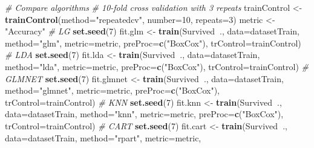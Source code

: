 \documentclass[]{article}
\newenvironment{Shaded}{\begin{snugshade}}{\end{snugshade}}
\newcommand{\KeywordTok}[1]{\textcolor[rgb]{0.13,0.29,0.53}{\textbf{#1}}}
\newcommand{\DataTypeTok}[1]{\textcolor[rgb]{0.13,0.29,0.53}{#1}}
\newcommand{\DecValTok}[1]{\textcolor[rgb]{0.00,0.00,0.81}{#1}}
\newcommand{\StringTok}[1]{\textcolor[rgb]{0.31,0.60,0.02}{#1}}
\newcommand{\CommentTok}[1]{\textcolor[rgb]{0.56,0.35,0.01}{\textit{#1}}}
\newcommand{\OperatorTok}[1]{\textcolor[rgb]{0.81,0.36,0.00}{\textbf{#1}}}
\newcommand{\NormalTok}[1]{#1}
\begin{document}
\begin{Shaded}
\begin{Highlighting}[]
\CommentTok{# Compare algorithms}
\CommentTok{# 10-fold cross validation with 3 repeats}
\NormalTok{trainControl <-}\StringTok{ }\KeywordTok{trainControl}\NormalTok{(}\DataTypeTok{method=}\StringTok{"repeatedcv"}\NormalTok{, }\DataTypeTok{number=}\DecValTok{10}\NormalTok{, }\DataTypeTok{repeats=}\DecValTok{3}\NormalTok{)}
\NormalTok{metric <-}\StringTok{ "Accuracy"}
\CommentTok{# LG}
\KeywordTok{set.seed}\NormalTok{(}\DecValTok{7}\NormalTok{)}
\NormalTok{fit.glm <-}\StringTok{ }\KeywordTok{train}\NormalTok{(Survived}\OperatorTok{~}\NormalTok{., }\DataTypeTok{data=}\NormalTok{datasetTrain, }\DataTypeTok{method=}\StringTok{"glm"}\NormalTok{, }\DataTypeTok{metric=}\NormalTok{metric, }\DataTypeTok{preProc=}\KeywordTok{c}\NormalTok{(}\StringTok{"BoxCox"}\NormalTok{),}
    \DataTypeTok{trControl=}\NormalTok{trainControl)}
\CommentTok{# LDA}
\KeywordTok{set.seed}\NormalTok{(}\DecValTok{7}\NormalTok{)}
\NormalTok{fit.lda <-}\StringTok{ }\KeywordTok{train}\NormalTok{(Survived}\OperatorTok{~}\NormalTok{., }\DataTypeTok{data=}\NormalTok{datasetTrain, }\DataTypeTok{method=}\StringTok{"lda"}\NormalTok{, }\DataTypeTok{metric=}\NormalTok{metric, }\DataTypeTok{preProc=}\KeywordTok{c}\NormalTok{(}\StringTok{"BoxCox"}\NormalTok{),}
    \DataTypeTok{trControl=}\NormalTok{trainControl)}
\CommentTok{# GLMNET}
\KeywordTok{set.seed}\NormalTok{(}\DecValTok{7}\NormalTok{)}
\NormalTok{fit.glmnet <-}\StringTok{ }\KeywordTok{train}\NormalTok{(Survived}\OperatorTok{~}\NormalTok{., }\DataTypeTok{data=}\NormalTok{datasetTrain, }\DataTypeTok{method=}\StringTok{"glmnet"}\NormalTok{, }\DataTypeTok{metric=}\NormalTok{metric,}
    \DataTypeTok{preProc=}\KeywordTok{c}\NormalTok{(}\StringTok{"BoxCox"}\NormalTok{), }\DataTypeTok{trControl=}\NormalTok{trainControl)}
\CommentTok{# KNN}
\KeywordTok{set.seed}\NormalTok{(}\DecValTok{7}\NormalTok{)}
\NormalTok{fit.knn <-}\StringTok{ }\KeywordTok{train}\NormalTok{(Survived}\OperatorTok{~}\NormalTok{., }\DataTypeTok{data=}\NormalTok{datasetTrain, }\DataTypeTok{method=}\StringTok{"knn"}\NormalTok{, }\DataTypeTok{metric=}\NormalTok{metric, }\DataTypeTok{preProc=}\KeywordTok{c}\NormalTok{(}\StringTok{"BoxCox"}\NormalTok{),}
    \DataTypeTok{trControl=}\NormalTok{trainControl)}
\CommentTok{# CART}
\KeywordTok{set.seed}\NormalTok{(}\DecValTok{7}\NormalTok{)}
\NormalTok{fit.cart <-}\StringTok{ }\KeywordTok{train}\NormalTok{(Survived}\OperatorTok{~}\NormalTok{., }\DataTypeTok{data=}\NormalTok{datasetTrain, }\DataTypeTok{method=}\StringTok{"rpart"}\NormalTok{, }\DataTypeTok{metric=}\NormalTok{metric,}

\end{Highlighting}
\end{Shaded}
\end{document}
